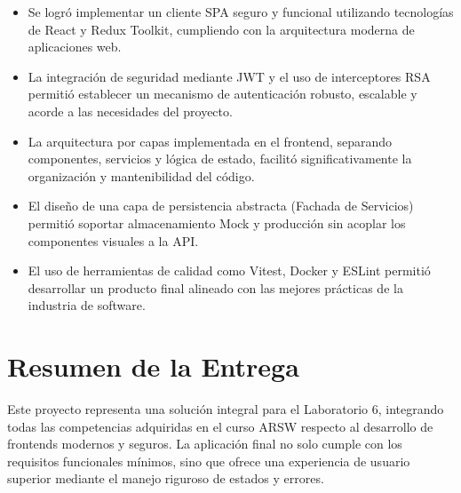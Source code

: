 \documentclass[12pt,a4paper]{article}
\begin{document}
\begin{itemize}
    \item Se logró implementar un cliente SPA seguro y funcional utilizando tecnologías de React y Redux Toolkit, cumpliendo con la arquitectura moderna de aplicaciones web.
    \item La integración de seguridad mediante JWT y el uso de interceptores RSA permitió establecer un mecanismo de autenticación robusto, escalable y acorde a las necesidades del proyecto.
    \item La arquitectura por capas implementada en el frontend, separando componentes, servicios y lógica de estado, facilitó significativamente la organización y mantenibilidad del código.
    \item El diseño de una capa de persistencia abstracta (Fachada de Servicios) permitió soportar almacenamiento Mock y producción sin acoplar los componentes visuales a la API.
    \item El uso de herramientas de calidad como Vitest, Docker y ESLint permitió desarrollar un producto final alineado con las mejores prácticas de la industria de software.
\end{itemize}

\newpage

\section{Resumen de la Entrega}
Este proyecto representa una solución integral para el Laboratorio 6, integrando todas las competencias adquiridas en el curso ARSW respecto al desarrollo de frontends modernos y seguros. La aplicación final no solo cumple con los requisitos funcionales mínimos, sino que ofrece una experiencia de usuario superior mediante el manejo riguroso de estados y errores.
\end{document}
